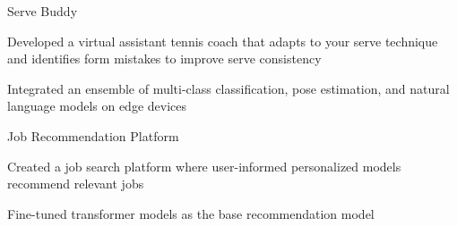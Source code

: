
\begin{cventries}

\cventry
    {} %
    {Serve Buddy} %
    {} %
    {} %
    {
      \begin{cvitems} %
        \item{Developed a virtual assistant tennis coach that adapts to your serve technique and identifies form mistakes to improve serve consistency}
        \item{Integrated an ensemble of multi-class classification, pose estimation, and natural language models on edge devices}
      \end{cvitems}
    }
\cventry
    {} %
    {Job Recommendation Platform} %
    {} %
    {} %
    {
      \begin{cvitems} %
        \item{Created a job search platform where user-informed personalized models recommend relevant jobs}
        \item{Fine-tuned transformer models as the base recommendation model}
      \end{cvitems}
    }
\end{cventries}



